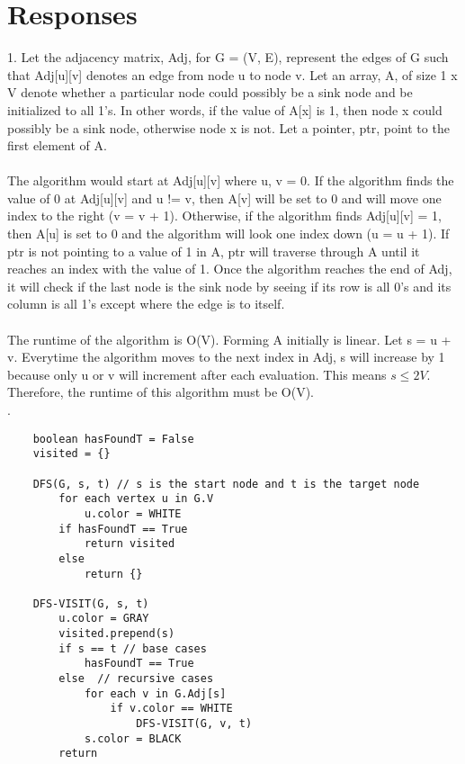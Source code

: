 \documentclass[12pt, a4paper]{article}
\begin{document}
\newenvironment{claim}[1]{\par\noindent\underline{Claim:}\space#1}{}
\newenvironment{base}[1]{\par\noindent\underline{Base:}\space#1}{}
\newenvironment{inductive}[1]{\par\noindent\underline{Inductive:}\space#1}{}
\maketitle
\section*{\centering Responses}
1.  Let the adjacency matrix, Adj, for G = (V, E), represent the edges of G such that Adj[u][v] denotes an edge from node u to node v.
Let an array, A, of size 1 x V denote whether a particular node could possibly be a sink node and be initialized to all 1's.
In other words, if the value of A[x] is 1, then node x could possibly be a sink node, otherwise node x is not.
Let a pointer, ptr, point to the first element of A.
\\
\\
The algorithm would start at Adj[u][v] where u, v = 0.
If the algorithm finds the value of 0 at Adj[u][v] and u != v, then A[v] will be set to 0 and will move one index to the right (v = v + 1).
Otherwise, if the algorithm finds Adj[u][v] = 1, then A[u] is set to 0 and the algorithm will look one index down (u = u + 1).
If ptr is not pointing to a value of 1 in A, ptr will traverse through A until it reaches an index with the value of 1.
Once the algorithm reaches the end of Adj, it will check if the last node is the sink node by seeing if its row is all 0's and its column is all 1's except where the edge is to itself.
\\
\\
The runtime of the algorithm is O(V).
Forming A initially is linear.
Let s = u + v.
Everytime the algorithm moves to the next index in Adj, s will increase by 1 because only u or v will increment after each evaluation.
This means $s \leq 2V$.
Therefore, the runtime of this algorithm must be O(V).
\\
. 
\begin{lstlisting}
    boolean hasFoundT = False
    visited = {}

    DFS(G, s, t) // s is the start node and t is the target node
        for each vertex u in G.V
            u.color = WHITE
        if hasFoundT == True
            return visited
        else 
            return {}
    
    DFS-VISIT(G, s, t)
        u.color = GRAY
        visited.prepend(s)
        if s == t // base cases
            hasFoundT == True
        else  // recursive cases
            for each v in G.Adj[s]
                if v.color == WHITE
                    DFS-VISIT(G, v, t)
            s.color = BLACK
        return
\end{lstlisting}
\end{document}
